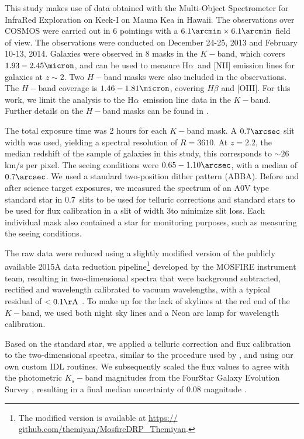 \documentclass{emulateapj}
\newcommand{\ha}{H$\alpha$}
\begin{document}
This study makes use of data obtained with the Multi-Object Spectrometer for InfraRed Exploration \citep[MOSFIRE;][]{Mclean10} on Keck-I on Mauna Kea in Hawaii. The observations over COSMOS were carried out in 6 pointings with a $6.1\arcmin\times6.1\arcmin$ field of view. The observations were conducted on December 24-25, 2013 and February 10-13, 2014. Galaxies were observed in 8 masks in the $K-$band, which covers $1.93-2.45\micron$, and can be used to measure \ha\ and [NII] emission lines for galaxies at $z\sim2$. Two $H-$band masks were also included in the observations. The $H-$band coverage is $1.46-1.81\micron$, covering $H\beta$ and [OIII]. For this work, we limit the analysis to the \ha\ emission line data in the $K-$band. Further details on the $H-$band masks can be found in \citet{Nanayakkara16}. 

The total exposure time was 2 hours for each $K-$band mask. A $0.7\arcsec$ slit width was used, yielding {a} spectral resolution {of $R=3610$}. At $z=2.2$, the median redshift of the sample of galaxies in this study, this corresponds to {$\sim26$} km/s per pixel. The seeing conditions were $0.65-1.10\arcsec$, with a median of $0.7\arcsec$. We used a standard two-position dither pattern (ABBA). Before and after science target exposures, we measured the spectrum of an A0V type standard star in 0.7\arcsec\ slits to be used for telluric corrections and standard stars to be used for flux calibration in a slit of width 3\arcsec to minimize slit loss. Each individual mask also contained a star for monitoring purposes, such as measuring the seeing conditions.

The raw data were reduced using {a slightly modified version of} the publicly available {2015A} data reduction pipeline\footnote{The modified version is available at \url{https:// github.com/themiyan/MosfireDRP_Themiyan}.} developed by the MOSFIRE instrument team, resulting in two-dimensional spectra that were background subtracted, rectified and wavelength calibrated to vacuum wavelengths, with a typical residual of $<0.1\mathrm{\AA}$ \citep{Nanayakkara16}. To make up for the lack of skylines at the red end of the $K-$band, we used both night sky lines and a Neon arc lamp for wavelength calibration.

Based on the standard star, we applied a telluric correction and flux calibration to the two-dimensional spectra, similar to the procedure used by \citep{Steidel14}, and using our own custom IDL routines. {We subsequently scaled the flux values to agree with the photometric $K_s-$band magnitudes from the FourStar \citep{Persson13} Galaxy Evolution Survey \citep[ZFOURGE;][]{Straatman16}, resulting in a final median uncertainty of 0.08 magnitude \citep[see also][]{Nanayakkara16}}.
\end{document}
